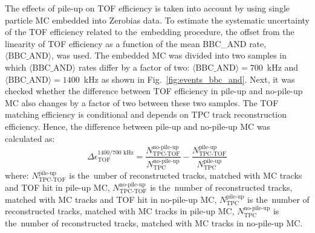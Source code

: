 The effects of pile-up on TOF efficiency is taken into account by using single particle MC embedded into Zerobias data. To estimate the systematic uncertainty of the TOF efficiency related to the~embedding procedure, the offset from the linearity of TOF efficiency  as a function of the mean BBC\_AND rate, $\langle\text{BBC\_AND}\rangle$, was used. The embedded MC was divided into two samples in which $\langle\text{BBC\_AND}\rangle$ rates differ by a factor of two: \mbox{$\langle\text{BBC\_AND}\rangle=700$~kHz} and \mbox{$\langle\text{BBC\_AND}\rangle=1400$~kHz} as shown in Fig.~\ref{fig:events_bbc_and}.
Next, it was checked whether the difference between TOF efficiency in pile-up and no-pile-up MC also changes by a factor of two between these two samples. The TOF matching efficiency is conditional and depends on TPC track reconstruction efficiency. Hence, the difference between pile-up and  no-pile-up MC was calculated as:
\begin{equation}
\Delta\epsilon_\textrm{TOF}^{1400/700\text{ kHz}}=\frac{N_\textrm{TPC-TOF}^\textrm{no-pile-up}}{N_\textrm{TPC}^\textrm{no-pile-up}}-\frac{N_\textrm{TPC-TOF}^\textrm{pile-up}}{N_\textrm{TPC}^\textrm{pile-up}}
\label{eq:tofSyst}
\end{equation}
where: $N_\textrm{TPC-TOF}^\textrm{pile-up}$ is the~umber of reconstructed tracks, matched with MC tracks and TOF hit in pile-up MC, $N_\textrm{TPC-TOF}^\textrm{no-pile-up}$ is the~number of reconstructed tracks, matched with MC tracks and TOF hit in no-pile-up MC, $N_\textrm{TPC}^\textrm{pile-up}$ is the~number of reconstructed tracks, matched with MC tracks in pile-up MC, $N_\textrm{TPC}^\textrm{no-pile-up}$ is the~number of reconstructed tracks, matched with MC tracks in no-pile-up MC.
\newline

